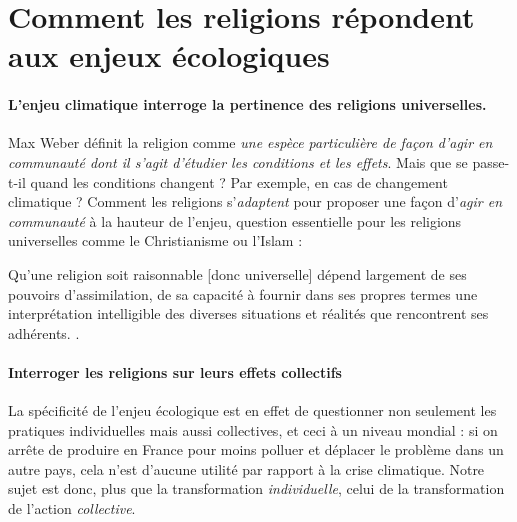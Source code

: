 



\section{Comment les religions répondent aux  enjeux écologiques}

 



\paragraph{L'enjeu climatique interroge la pertinence des religions universelles.} Max Weber définit la religion comme \textit{une espèce particulière de façon d'agir en communauté dont il s'agit d'étudier les conditions et les effets}. Mais que se passe-t-il quand les conditions changent ? Par exemple, en cas de changement climatique ? Comment les religions s'\textit{adaptent} pour proposer une façon d'\textit{agir en communauté } à la hauteur de l'enjeu, question essentielle pour les religions universelles comme le Christianisme ou l'Islam : 

\begin{singlequote}
        Qu’une religion soit raisonnable [donc universelle] dépend largement de ses
pouvoirs d’assimilation, de sa capacité à fournir dans ses propres termes une
interprétation intelligible des diverses situations et réalités que rencontrent
ses adhérents. \cite[ p. 175]{lindbeck_nature_2002}.
\end{singlequote}


\paragraph{Interroger les religions sur leurs effets collectifs}
La spécificité de l'enjeu écologique est en effet de questionner non seulement les pratiques individuelles mais aussi collectives, et ceci à un niveau mondial : si on arrête de produire en France pour moins polluer et déplacer le problème dans un autre pays, cela n'est d'aucune utilité par rapport à la crise climatique.
Notre sujet est donc, plus que la transformation \textit{individuelle}, celui de la transformation de l'action \textit{collective}.







